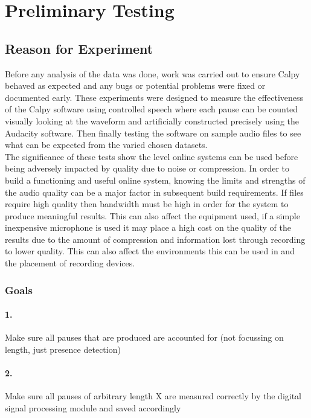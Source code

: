 \newpage
\section{Preliminary Testing}
\subsection{Reason for Experiment}
Before any analysis of the data was done, work was carried out to ensure Calpy behaved as expected and any bugs or potential problems were fixed or documented early. These experiments were designed to measure the effectiveness of the Calpy software using controlled speech where each pause can be counted visually looking at the waveform and artificially constructed precisely using the Audacity software. Then finally testing the software on sample audio files to see what can be expected from the varied chosen datasets. \\

The significance of these tests show the level online systems can be used before being adversely impacted by quality due to noise or compression. In order to build a functioning and useful online system, knowing the limits and strengths of the audio quality can be a major factor in subsequent build requirements. If files require high quality then bandwidth must be high in order for the system to produce meaningful results. This can also affect the equipment used, if a simple inexpensive microphone is used it may place a high cost on the quality of the results due to the amount of compression and information lost through recording to lower quality. This can also affect the environments this can be used in and the placement of recording devices. \\  

\subsubsection{Goals}
\paragraph{1.} Make sure all pauses that are produced are accounted for (not focussing on length, just presence detection)
\paragraph{2.} Make sure all pauses of arbitrary length X are measured correctly by the digital signal processing module and saved accordingly 
